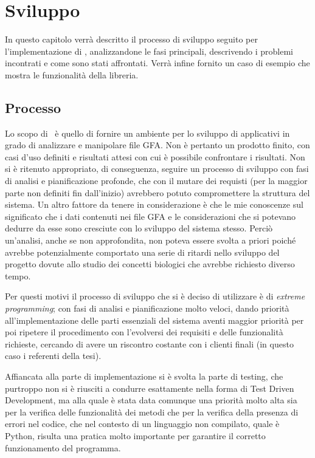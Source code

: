 \chapter{Sviluppo}
In questo capitolo verrà descritto il processo di sviluppo
seguito per l'implementazione di \pygfa, analizzandone le
fasi principali, descrivendo i problemi incontrati e come sono stati
affrontati. Verrà infine fornito un caso di esempio che mostra
le funzionalità della libreria.

\section{Processo}
Lo scopo di \pygfa \ è quello di fornire un ambiente per lo sviluppo
di applicativi in grado di analizzare e manipolare file GFA. Non
è pertanto un prodotto finito, con casi d'uso definiti e risultati attesi
con cui è possibile confrontare i risultati. Non si è ritenuto appropriato,
di conseguenza, seguire un processo di sviluppo con fasi di analisi
e pianificazione profonde, che con il mutare dei requisti (per la
maggior parte non definiti fin dall'inizio) avrebbero potuto
compromettere la struttura del sistema. Un altro fattore da
tenere in considerazione è che le mie conoscenze sul significato
che i dati contenuti nei file GFA e le considerazioni che si potevano dedurre
da esse sono cresciute con lo sviluppo del sistema stesso. Perciò un'analisi,
anche se non approfondita, non poteva essere svolta a priori poiché
avrebbe potenzialmente comportato una serie di ritardi
nello sviluppo del progetto dovute allo studio dei concetti biologici
che avrebbe richiesto diverso tempo.


Per questi motivi il processo di sviluppo che si è deciso di utilizzare è di \emph{extreme}
\emph{programming}; con fasi di analisi e pianificazione molto veloci,
dando priorità all'implementazione delle parti essenziali del sistema aventi
maggior priorità per poi ripetere il procedimento con l'evolversi dei
requisiti e delle funzionalità richieste, cercando di avere un riscontro
costante con i clienti finali (in questo caso i referenti della tesi).

Affiancata alla parte di implementazione si è svolta la parte di testing,
che purtroppo non si è riusciti a condurre esattamente nella forma di Test Driven
Development, ma alla quale è stata data comunque una priorità molto alta
sia per la verifica delle funzionalità dei metodi che per la verifica della
presenza di errori nel codice, che nel contesto di un linguaggio non compilato,
quale è Python, risulta una pratica molto importante per garantire il
corretto funzionamento del programma.

